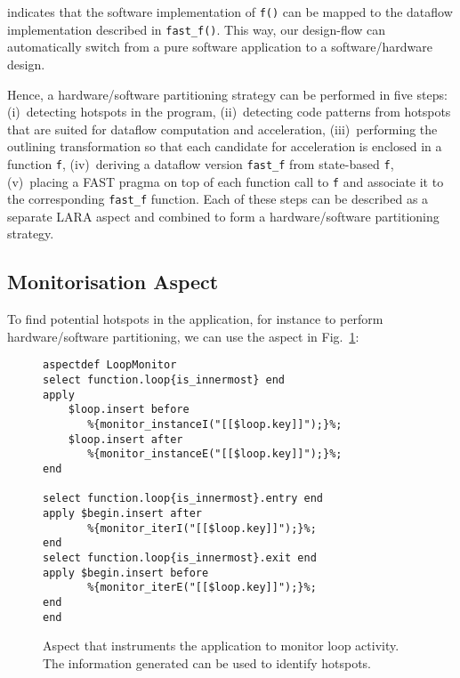 \noindent indicates that the software implementation of \texttt{f()} can be
mapped to the dataflow implementation described in \texttt{fast\_f()}. This
way, our design-flow can automatically switch from a pure software
application to a software/hardware design.

Hence, a hardware/software partitioning strategy can be performed in
five steps: (i)~detecting hotspots in the program, (ii)~detecting code
patterns from hotspots that are suited for dataflow computation and
acceleration, (iii)~performing the outlining transformation so that
each candidate for acceleration is enclosed in a function \texttt{f},
(iv)~deriving a dataflow version \texttt{fast\_f} from state-based \texttt{f},
(v)~placing a FAST pragma on top of each function call to \texttt{f} and
associate it to the corresponding \texttt{fast\_f} function. Each of these
steps can be described as a separate LARA aspect and combined to form a
hardware/software partitioning strategy.

\subsection{Monitorisation Aspect}
\label{sect:asp_mon}
To find potential hotspots in the application, for instance to perform
hardware/software partitioning, we can use the aspect in Fig.~\ref{fig:hotspot}:

\lstset{style=lara}
\begin{figure}[!h]
\begin{lstlisting}
aspectdef LoopMonitor
select function.loop{is_innermost} end
apply
    $loop.insert before
       %{monitor_instanceI("[[$loop.key]]");}%;
    $loop.insert after
       %{monitor_instanceE("[[$loop.key]]");}%;
end

select function.loop{is_innermost}.entry end
apply $begin.insert after
       %{monitor_iterI("[[$loop.key]]");}%;
end
select function.loop{is_innermost}.exit end
apply $begin.insert before
       %{monitor_iterE("[[$loop.key]]");}%;
end
end
\end{lstlisting}
\caption{Aspect that instruments the application to monitor loop
  activity. The information generated can be used to identify
  hotspots.}
\label{fig:hotspot}
\end{figure}

